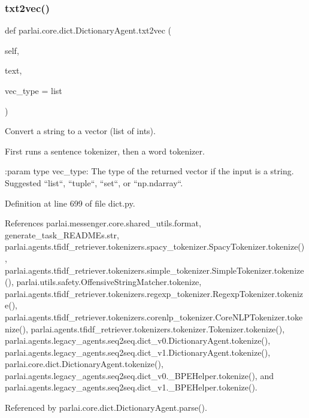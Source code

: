 \subsubsection{\texorpdfstring{txt2vec()}{txt2vec()}}
{\footnotesize\ttfamily def parlai.\+core.\+dict.\+Dictionary\+Agent.\+txt2vec (\begin{DoxyParamCaption}\item[{}]{self,  }\item[{}]{text,  }\item[{}]{vec\+\_\+type = {\ttfamily list} }\end{DoxyParamCaption})}

\begin{DoxyVerb}Convert a string to a vector (list of ints).

First runs a sentence tokenizer, then a word tokenizer.

:param type vec_type:
    The type of the returned vector if the input is a string. Suggested
    ``list``, ``tuple``, ``set``, or ``np.ndarray``.
\end{DoxyVerb}
 

Definition at line 699 of file dict.\+py.



References parlai.\+messenger.\+core.\+shared\+\_\+utils.\+format, generate\+\_\+task\+\_\+\+R\+E\+A\+D\+M\+Es.\+str, parlai.\+agents.\+tfidf\+\_\+retriever.\+tokenizers.\+spacy\+\_\+tokenizer.\+Spacy\+Tokenizer.\+tokenize(), parlai.\+agents.\+tfidf\+\_\+retriever.\+tokenizers.\+simple\+\_\+tokenizer.\+Simple\+Tokenizer.\+tokenize(), parlai.\+utils.\+safety.\+Offensive\+String\+Matcher.\+tokenize, parlai.\+agents.\+tfidf\+\_\+retriever.\+tokenizers.\+regexp\+\_\+tokenizer.\+Regexp\+Tokenizer.\+tokenize(), parlai.\+agents.\+tfidf\+\_\+retriever.\+tokenizers.\+corenlp\+\_\+tokenizer.\+Core\+N\+L\+P\+Tokenizer.\+tokenize(), parlai.\+agents.\+tfidf\+\_\+retriever.\+tokenizers.\+tokenizer.\+Tokenizer.\+tokenize(), parlai.\+agents.\+legacy\+\_\+agents.\+seq2seq.\+dict\+\_\+v0.\+Dictionary\+Agent.\+tokenize(), parlai.\+agents.\+legacy\+\_\+agents.\+seq2seq.\+dict\+\_\+v1.\+Dictionary\+Agent.\+tokenize(), parlai.\+core.\+dict.\+Dictionary\+Agent.\+tokenize(), parlai.\+agents.\+legacy\+\_\+agents.\+seq2seq.\+dict\+\_\+v0.\+\_\+\+B\+P\+E\+Helper.\+tokenize(), and parlai.\+agents.\+legacy\+\_\+agents.\+seq2seq.\+dict\+\_\+v1.\+\_\+\+B\+P\+E\+Helper.\+tokenize().



Referenced by parlai.\+core.\+dict.\+Dictionary\+Agent.\+parse().

